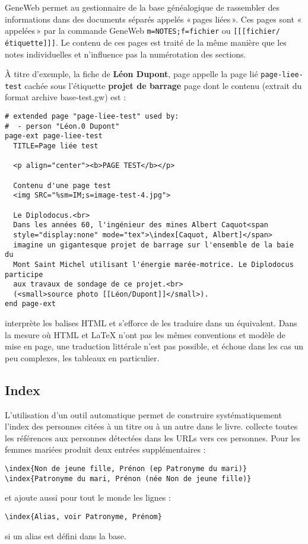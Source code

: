 \begin{description}[style=nextline]
\item[Pages liées] GeneWeb permet au gestionnaire de la base généalogique
de rassembler des informations dans des documents séparés appelés «\,pages liées\,».
Ces pages sont «\,appelées\,» par la commande GeneWeb \verb|m=NOTES;f=fichier| ou
\verb|[[[fichier/étiquette]]]|. Le contenu de ces pages est traité de la même
manière que les notes individuelles et n'influence pas la numérotation
des sections.

À titre d'exemple, la fiche de
{\bf Léon Dupont}, page \pageref{leondupont} appelle la page lié
\verb|page-liee-test| cachée sous l'étiquette {\bf projet de barrage}
page \pageref{pageliee} dont le contenu (extrait du format archive
base-test.gw) est :

\begin{verbatim}
# extended page "page-liee-test" used by:
#  - person "Léon.0 Dupont"
page-ext page-liee-test
  TITLE=Page liée test
  
  <p align="center"><b>PAGE TEST</b></p>
  
  Contenu d'une page test
  <img SRC="%sm=IM;s=image-test-4.jpg">
  
  Le Diplodocus.<br>
  Dans les années 60, l'ingénieur des mines Albert Caquot<span
  style="display:none" mode="tex">\index[Caquot, Albert]</span>
  imagine un gigantesque projet de barrage sur l'ensemble de la baie du
  Mont Saint Michel utilisant l'énergie marée-motrice. Le Diplodocus participe
  aux travaux de sondage de ce projet.<br>
  (<small>source photo [[Léon/Dupont]]</small>).
end page-ext
\end{verbatim}

\item[Autres pages] \gwtol{} interprète les balises HTML et s'efforce de
les traduire dans un équivalent. Dans la mesure où HTML et \LaTeX{} n'ont pas
les mêmes conventions et modèle de mise en page, une traduction littérale
n'est pas possible, et échoue dans les cas un peu complexes, les tableaux
en particulier.

\end{description}

\subsection{Index}

L'utilisation d'un outil automatique permet de construire systématiquement
l'index des personnes citées à un titre ou à un autre dans le livre.
\gwtol{} collecte toutes les références aux personnes
détectées dans les URLs vers ces personnes. Pour les femmes mariées
\gwtol{} produit deux entrées supplémentaires :
\begin{verbatim}
\index{Non de jeune fille, Prénon (ep Patronyme du mari)}
\index{Patronyme du mari, Prénon (née Non de jeune fille)}
\end{verbatim}
et ajoute aussi pour tout le monde les lignes :
\begin{verbatim}
\index{Alias, voir Patronyme, Prénom}
\end{verbatim}
si un alias est défini dans la base.


